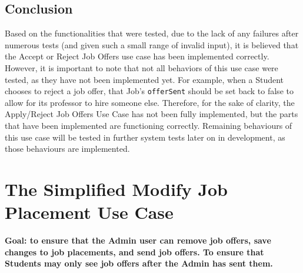 \documentclass[12pt]{report}
\begin{document}
\subsection*{Conclusion}
Based on the functionalities that were tested, due to the lack of any failures after numerous tests
(and given such a small range of invalid input), it is believed that the Accept or Reject Job Offers
use case has been implemented correctly.\\
However, it is important to note that not all behaviors of this use case were tested, as they have
not been implemented yet. For example, when a Student chooses to reject a job offer, that Job's
\texttt{offerSent} should be set back to false to allow for its professor to hire someone else.
Therefore, for the sake of clarity, the Apply/Reject Job Offers Use Case has not been fully
implemented, but the parts that have been implemented are functioning correctly. Remaining
behaviours of this use case will be tested in further system tests later on in development, as those
behaviours are implemented.

\section{The Simplified Modify Job Placement Use Case}
\textbf{Goal: to ensure that the Admin user can remove job offers, save changes to job placements,
	and send job offers. To ensure that Students may only see job offers after the Admin has sent
them.}
\end{document}
